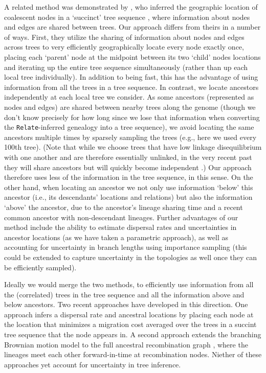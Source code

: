 \documentclass[12pt]{article}
\begin{document}
A related method was demonstrated by \cite{wohns2021unified}, who inferred the geographic location of coalescent nodes in a `succinct' tree sequence \citep{kelleher2018efficient}, where information about nodes and edges are shared between trees. Our approach differs from theirs in a number of ways. First, they utilize the sharing of information about nodes and edges across trees to very efficiently geographically locate every node exactly once, placing each `parent' node at the midpoint between its two `child' nodes locations and iterating up the entire tree sequence simultaneously (rather than up each local tree individually). In addition to being fast, this has the advantage of using information from all the trees in a tree sequence. In contrast, we locate ancestors independently at each local tree we consider. As some ancestors (represented as nodes and edges) are shared between nearby trees along the genome (though we don't know precisely for how long since we lose that information when converting the \texttt{Relate}-inferred genealogy into a tree sequence), we avoid locating the same ancestors multiple times by sparsely sampling the trees (e.g., here we used every 100th tree). (Note that while we choose trees that have low linkage disequilibrium with one another and are therefore essentially unlinked, in the very recent past they will share ancestors but will quickly become independent \citep{wakeley2012gene}.) Our approach therefore uses less of the information in the tree sequence, in this sense. On the other hand, when locating an ancestor we not only use information `below' this ancestor (i.e., its descendants' locations and relations) but also the information `above' the ancestor, due to the ancestor's lineage sharing time and a recent common ancestor with non-descendant lineages. Further advantages of our method include the ability to estimate dispersal rates and uncertainties in ancestor locations (as we have taken a parametric approach), as well as accounting for uncertainty in branch lengths using importance sampling (this could be extended to capture uncertainty in the topologies as well once they can be efficiently sampled).

Ideally we would merge the two methods, to efficiently use information from all the (correlated) trees in the tree sequence and all the information above and below ancestors. Two recent approaches have developed in this direction. One approach \citep{grundler2024geographic} infers a dispersal rate and ancestral locations by placing each node at the location that minimizes a migration cost averaged over the trees in a succint tree sequence that the node appears in. A second approach \citep{deraje2024inferring} extends the branching Brownian motion model to the full ancestral recombination graph \citep[as inferred using a program like \texttt{ARGweaver;}][]{rasmussen2014genome}, where the lineages meet each other forward-in-time at recombination nodes. Niether of these approaches yet account for uncertainty in tree inference.
\end{document}
